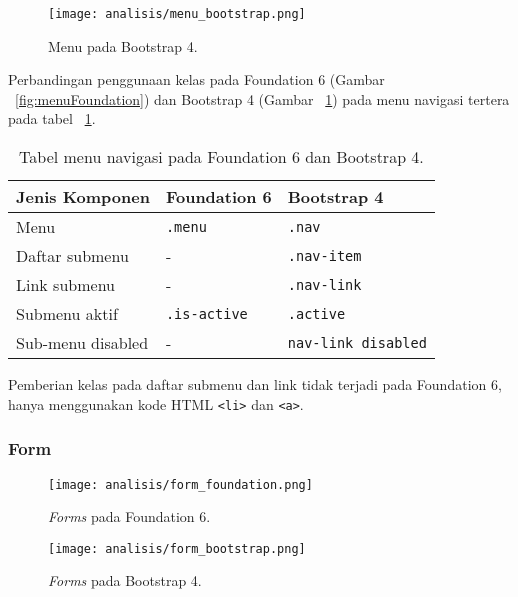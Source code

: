 \begin{figure} [H]
	\centering  
	\texttt{[image: analisis/menu\_bootstrap.png]}  
	\caption{Menu pada Bootstrap 4.}
	\label{fig:menuBootstrap}	 
\end{figure}
\noindent Perbandingan penggunaan kelas pada Foundation 6 (Gambar ~\ref{fig:menuFoundation}) dan Bootstrap 4 (Gambar ~\ref{fig:menuBootstrap}) pada menu navigasi tertera pada tabel ~\ref{table:konversiNavigasi}.\\
\begin{table}[H]
	\caption{Tabel menu navigasi pada Foundation 6 dan Bootstrap 4.}
	\begin{tabular}{| p{} | p{} | p{} |} 
		\hline
		\textbf{Jenis Komponen} & \textbf{Foundation 6} & \textbf{Bootstrap 4}  \\ [0.5ex] 
		\hline	
		Menu &\texttt{.menu} & \texttt{.nav } \\
		\hline	
		Daftar submenu & - & \texttt{.nav-item} \\
		\hline
		Link submenu & - & \texttt{.nav-link} \\
		\hline
		Submenu aktif & \texttt{.is-active} & \texttt{.active}  \\
		\hline
		Sub-menu disabled & - & \texttt{nav-link disabled}  \\[1ex] 
		\hline
	\end{tabular}
	\label{table:konversiNavigasi}
\end{table}
Pemberian kelas pada daftar submenu dan link tidak terjadi pada Foundation 6, hanya menggunakan kode HTML \texttt{<li>} dan \texttt{<a>}.

\subsubsection{Form}
\begin{figure} [H]
	\centering  
	\texttt{[image: analisis/form\_foundation.png]}  
	\caption{\textit{Forms} pada Foundation 6.}
	\label{fig:formFoundation}	 
\end{figure}



\begin{figure} [H]
	\centering  
	\texttt{[image: analisis/form\_bootstrap.png]}  
	\caption{\textit{Forms} pada Bootstrap 4.}
	\label{fig:formBootstrap}	 
\end{figure}

